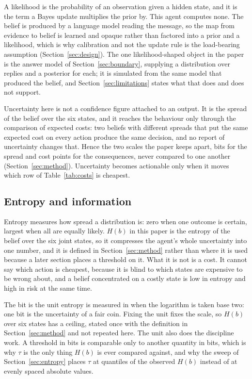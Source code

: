\documentclass{article}
\begin{document}
A likelihood is the probability of an observation given a hidden state, and it is the
term a Bayes update multiplies the prior by. This agent computes none. The belief is
produced by a language model reading the message, so the map from evidence to belief
is learned and opaque rather than factored into a prior and a likelihood, which is why
calibration and not the update rule is the load-bearing assumption
(Section~\ref{sec:design}). The one likelihood-shaped object in the paper is the
answer model of Section~\ref{sec:boundary}, supplying a distribution over replies and
a posterior for each; it is simulated from the same model that produced the belief,
and Section~\ref{sec:limitations} states what that does and does not support.

Uncertainty here is not a confidence figure attached to an output. It is the spread of
the belief over the six states, and it reaches the behaviour only through the
comparison of expected costs: two beliefs with different spreads that put the same
expected cost on every action produce the same decision, and no report of uncertainty
changes that. Hence the two scales the paper keeps apart, bits for the spread and cost
points for the consequences, never compared to one another
(Section~\ref{sec:method}). Uncertainty becomes actionable only when it moves which
row of Table~\ref{tab:costs} is cheapest.

\subsection{Entropy and information}

Entropy measures how spread a distribution is: zero when one outcome is certain,
largest when all are equally likely. $H(b)$ in this paper is the entropy of the belief
over the six joint states, so it compresses the agent's whole uncertainty into one
number, and it is defined in Section~\ref{sec:method} rather than where it is used
because a later section places a threshold on it. What it is not is a cost. It cannot
say which action is cheapest, because it is blind to which states are expensive to be
wrong about, and a belief concentrated on a costly state is low in entropy and high in
risk at the same time.

The bit is the unit entropy is measured in when the logarithm is taken base two: one
bit is the uncertainty of a fair coin. Fixing the unit fixes the scale, so $H(b)$ over
six states has a ceiling, stated once with the definition in Section~\ref{sec:method}
and not repeated here. The unit also does the discipline work. A threshold in bits is
comparable only to another quantity in bits, which is why $\tau$ is the only thing
$H(b)$ is ever compared against, and why the sweep of Section~\ref{sec:entropy} places
$\tau$ at quantiles of the observed $H(b)$ instead of at evenly spaced absolute
values.
\end{document}
